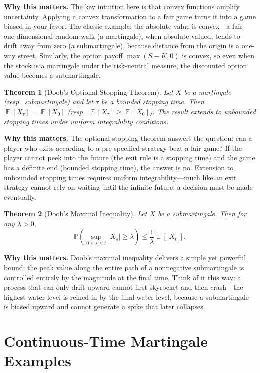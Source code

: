 \documentclass[11pt,a4paper,openany]{book}
\theoremstyle{definition}
\theoremstyle{plain}
\newtheorem{theorem}{Theorem}[chapter]
\theoremstyle{remark}
\DeclareMathOperator{\E}{\mathbb{E}}
\newcommand{\1}{\mathbbm{1}}
\newcommand{\Pbb}{\mathbb{P}}
\begin{document}
\medskip
\noindent\textbf{Why this matters.} The key intuition here is that convex functions amplify uncertainty. Applying a convex transformation to a fair game turns it into a game biased in your favor. The classic example: the absolute value is convex---a fair one-dimensional random walk (a martingale), when absolute-valued, tends to drift away from zero (a submartingale), because distance from the origin is a one-way street. Similarly, the option payoff $\max(S-K, 0)$ is convex, so even when the stock is a martingale under the risk-neutral measure, the discounted option value becomes a submartingale.

\begin{theorem}[Doob's Optional Stopping Theorem]
Let $X$ be a martingale (resp.\ submartingale) and let $\tau$ be a bounded stopping time. Then $\E[X_{\tau}] = \E[X_{0}]$ (resp.\ $\E[X_{\tau}] \geq \E[X_{0}]$). The result extends to unbounded stopping times under uniform integrability conditions.
\end{theorem}

\medskip
\noindent\textbf{Why this matters.} The optional stopping theorem answers the question: can a player who exits according to a pre-specified strategy beat a fair game? If the player cannot peek into the future (the exit rule is a stopping time) and the game has a definite end (bounded stopping time), the answer is no. Extension to unbounded stopping times requires uniform integrability---much like an exit strategy cannot rely on waiting until the infinite future; a decision must be made eventually.

\begin{theorem}[Doob's Maximal Inequality]
Let $X$ be a submartingale. Then for any $\lambda > 0$,
\[
\Pbb\left(\sup_{0 \leq s \leq t} |X_{s}| \geq \lambda\right) \leq \frac{1}{\lambda} \E[|X_{t}|].
\]
\end{theorem}

\medskip
\noindent\textbf{Why this matters.} Doob's maximal inequality delivers a simple yet powerful bound: the peak value along the entire path of a nonnegative submartingale is controlled entirely by the magnitude at the final time. Think of it this way: a process that can only drift upward cannot first skyrocket and then crash---the highest water level is reined in by the final water level, because a submartingale is biased upward and cannot generate a spike that later collapses.

\section{Continuous-Time Martingale Examples}
\end{document}
